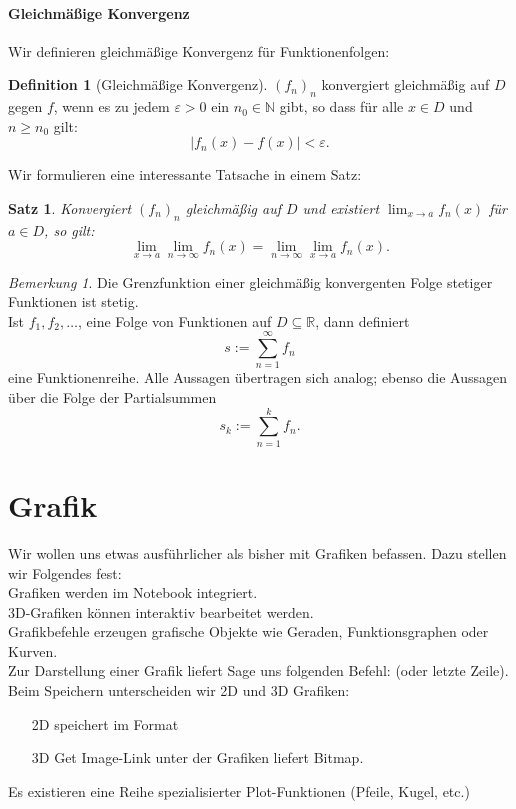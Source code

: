 \documentclass[fontsize=12pt,paper=a4,twoside,bibtotoc,idxtotoc,
liststotoc,pagesize,BCOR1.2cm,DIV15,chapterprefix,pagesize=pdftex]{scrbook}
\theoremstyle{plain}
\newtheorem{sz}[equation]{Satz}
\theoremstyle{definition}
\newtheorem{df}[equation]{Definition}
\theoremstyle{remark}
\newtheorem{bem}[equation]{Bemerkung}
\begin{document}
\subsubsection{Gleichmäßige Konvergenz}
Wir definieren gleichmäßige Konvergenz für Funktionenfolgen:
\begin{df}[Gleichmäßige Konvergenz]
$(f_n)_n$ konvergiert gleichmäßig auf $D$ gegen $f$, wenn es zu
jedem $\varepsilon >0$ ein $n_0 \in \mathbb{N}$ gibt, so dass für alle
$x \in D$ und $n\geq n_0$ gilt:
\[ |f_n(x) -f(x)| < \varepsilon.\]
\end{df}
Wir formulieren eine interessante Tatsache in einem Satz:
\begin{sz}
 Konvergiert $(f_n)_n$ gleichmäßig auf $D$ und existiert $\lim_{x
\rightarrow a} f_n(x)$ für $a\in D$, so gilt:
\[ \lim_{x \rightarrow a} \lim_{n \rightarrow \infty} f_n(x) = \lim_{n
\rightarrow \infty} \lim_{x \rightarrow a} f_n(x). \]
\end{sz}
\begin{bem}
 Die Grenzfunktion einer gleichmäßig konvergenten Folge stetiger
Funktionen ist stetig.\\
Ist $f_1, f_2, \ldots$, eine Folge von Funktionen auf $D \subseteq \mathbb{R}$, dann definiert
\[
 s := \sum_{n=1}^\infty f_n
\]
eine Funktionenreihe. Alle Aussagen übertragen sich analog; ebenso die Aussagen über die Folge der Partialsummen
\[
 s_k := \sum_{n=1}^k f_n.
\]
\end{bem}
\chapter{Grafik}
Wir wollen uns etwas ausführlicher als bisher mit Grafiken befassen. Dazu stellen wir Folgendes fest:\\
Grafiken werden im Notebook integriert.\\
3D-Grafiken können interaktiv bearbeitet werden.\\
Grafikbefehle erzeugen grafische Objekte wie Geraden, Funktionsgraphen oder Kurven.\\
Zur Darstellung einer Grafik liefert Sage uns folgenden Befehl:  (oder letzte Zeile).\\
Beim Speichern unterscheiden wir 2D und 3D Grafiken:
\begin{itemize}
\item[2D]  speichert im Format 
\item[3D] \glqq{}Get Image\grqq{}-Link unter der Grafiken liefert Bitmap.
\end{itemize}
Es existieren eine Reihe spezialisierter Plot-Funktionen (Pfeile, Kugel, etc.)
\end{document}

